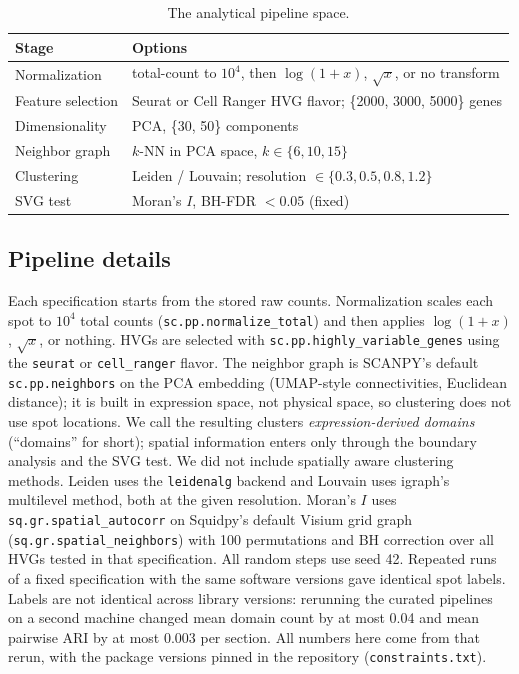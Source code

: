 \begin{table}[t]
  \centering
  \caption{The analytical pipeline space.}
  \label{tab:space}
  \footnotesize
  \setlength{\tabcolsep}{4pt}
  \begin{tabular}{@{}p{}p{}@{}}
    \toprule
    Stage & Options \\
    \midrule
    Normalization & total-count to $10^4$, then $\log(1+x)$, $\sqrt{x}$, or no transform \\
    Feature selection & Seurat or Cell Ranger HVG flavor; \{2000, 3000, 5000\} genes \\
    Dimensionality & PCA, \{30, 50\} components \\
    Neighbor graph & $k$-NN in PCA space, $k \in \{6, 10, 15\}$ \\
    Clustering & Leiden / Louvain; resolution $\in \{0.3,0.5,0.8,1.2\}$ \\
    SVG test & Moran's $I$, BH-FDR $<0.05$ (fixed) \\
    \bottomrule
  \end{tabular}
\end{table}

\subsection{Pipeline details}
Each specification starts from the stored raw counts. Normalization scales
each spot to $10^4$ total counts (\texttt{sc.pp.normalize\_total}) and then
applies $\log(1+x)$, $\sqrt{x}$, or nothing. HVGs are selected with
\texttt{sc.pp.highly\_variable\_genes} using the \texttt{seurat} or
\texttt{cell\_ranger} flavor. The neighbor graph is SCANPY's default
\texttt{sc.pp.neighbors} on the PCA embedding (UMAP-style connectivities,
Euclidean distance); it is built in expression space, not physical space,
so clustering does not use spot locations. We call the resulting clusters
\emph{expression-derived domains} (``domains'' for short); spatial
information enters only through the boundary analysis and the SVG test.
We did not include spatially aware clustering methods. Leiden uses the
\texttt{leidenalg} backend and Louvain uses igraph's multilevel method,
both at the given resolution. Moran's $I$ uses
\texttt{sq.gr.spatial\_autocorr} on Squidpy's default Visium grid graph
(\texttt{sq.gr.spatial\_neighbors}) with 100 permutations and BH
correction over all HVGs tested in that specification. All random steps
use seed 42. Repeated runs of a fixed specification with the same
software versions gave identical spot labels. Labels are not identical
across library versions: rerunning the curated pipelines on a second
machine changed mean domain count by at most 0.04 and mean pairwise ARI by
at most 0.003 per section. All numbers here come from that rerun, with the
package versions pinned in the repository (\texttt{constraints.txt}).

